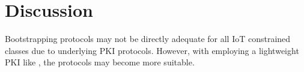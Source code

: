 \chapter{Discussion}
\label{ch:discussion}


Bootstrapping protocols may not be directly adequate for all IoT constrained classes due to underlying PKI protocols. However, with employing a lightweight PKI like \cite{hoglund2020pki4iot}, the protocols may become more suitable.